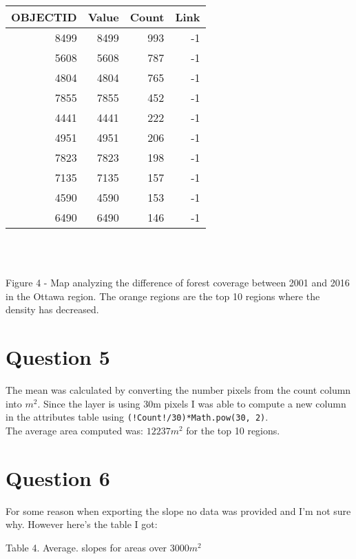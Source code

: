 \documentclass[fleqn, 12pt]{article}
\newcommand{\code}[2]{\colorbox{codegray}{\texttt{#2}}}
\begin{document}
\begin{tabular}{rrrr}
    \hline
        OBJECTID & Value & Count & Link\\\hline
        8499 & 8499 & 993 & -1\\
        5608 & 5608 & 787 & -1\\
        4804 & 4804 & 765 & -1\\
        7855 & 7855 & 452 & -1\\
        4441 & 4441 & 222 & -1\\
        4951 & 4951 & 206 & -1\\
        7823 & 7823 & 198 & -1\\
        7135 & 7135 & 157 & -1\\
        4590 & 4590 & 153 & -1\\
        6490 & 6490 & 146 & -1\\

    \hline
\end{tabular}\\\\

\begin{center}
    Figure 4 - Map analyzing the difference of forest coverage between 2001 and 2016 in the Ottawa region. The orange regions are the top 10 regions where the density has decreased.
\end{center}

\section*{Question 5}

The mean was calculated by converting the number pixels from the count column into $m^2$. Since the layer is using 30m pixels I was able to compute a new column in the attributes table using \code{text}{(!Count!/30)*Math.pow(30, 2)}.\\

The average area computed was: $12237m^2$ for the top 10 regions.

\section*{Question 6}

For some reason when exporting the slope no data was provided and I'm not sure why. However here's the table I got:

Table 4. Average. slopes for areas over $3000m^2$\\
\end{document}
